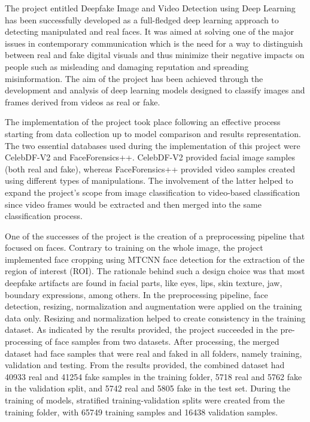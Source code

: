 \documentclass[12pt,a4paper]{report}
\begin{document}
The project entitled Deepfake Image and Video Detection using Deep Learning has been successfully developed as a full-fledged deep learning approach to detecting manipulated and real faces. It was aimed at solving one of the major issues in contemporary communication which is the need for a way to distinguish between real and fake digital visuals and thus minimize their negative impacts on people such as misleading and damaging reputation and spreading misinformation. The aim of the project has been achieved through the development and analysis of deep learning models designed to classify images and frames derived from videos as real or fake.

The implementation of the project took place following an effective process starting from data collection up to model comparison and results representation. The two essential databases used during the implementation of this project were CelebDF-V2 and FaceForensics++. CelebDF-V2 provided facial image samples (both real and fake), whereas FaceForensics++ provided video samples created using different types of manipulations. The involvement of the latter helped to expand the project's scope from image classification to video-based classification since video frames would be extracted and then merged into the same classification process.

One of the successes of the project is the creation of a preprocessing pipeline that focused on faces. Contrary to training on the whole image, the project implemented face cropping using MTCNN face detection for the extraction of the region of interest (ROI). The rationale behind such a design choice was that most deepfake artifacts are found in facial parts, like eyes, lips, skin texture, jaw, boundary expressions, among others. In the preprocessing pipeline, face detection, resizing, normalization and augmentation were applied on the training data only. Resizing and normalization helped to create consistency in the training dataset.
As indicated by the results provided, the project succeeded in the pre-processing of face samples from two datasets. After processing, the merged dataset had face samples that were real and faked in all folders, namely training, validation and testing. From the results provided, the combined dataset had 40933 real and 41254 fake samples in the training folder, 5718 real and 5762 fake in the validation split, and 5742 real and 5805 fake in the test set. During the training of models, stratified training-validation splits were created from the training folder, with 65749 training samples and 16438 validation samples.
\end{document}
